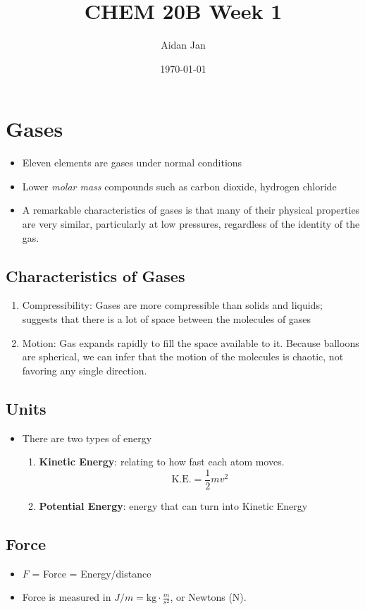 \documentclass[10pt]{article}
\title{CHEM 20B Week 1}
\author{Aidan Jan}
\date{\today}
\begin{document}
\maketitle
\section*{Gases}
\begin{itemize}
    \item Eleven elements are gases under normal conditions
    \item Lower \textit{molar mass} compounds such as carbon dioxide, hydrogen chloride
    \item A remarkable characteristics of gases is that many of their physical properties are very similar, particularly at low pressures, regardless of the identity of the gas.
\end{itemize}   

\subsection*{Characteristics of Gases}
\begin{enumerate}
    \item Compressibility: Gases are more compressible than solids and liquids; suggests that there is a lot of space between the molecules of gases
    \item Motion: Gas expands rapidly to fill the space available to it.  Because balloons are spherical, we can infer that the motion of the molecules is chaotic, not favoring any single direction.
\end{enumerate}

\subsection*{Units}
\begin{itemize}
    \item There are two types of energy
    \begin{enumerate}
        \item \textbf{Kinetic Energy}: relating to how fast each atom moves.
            \[\text{K.E.} = \frac{1}{2}mv^2\]
        \item \textbf{Potential Energy}: energy that can turn into Kinetic Energy
    \end{enumerate}
\end{itemize}

\subsection*{Force}
\begin{itemize}
    \item $F$ = Force = Energy/distance
    \item Force is measured in $J/m = \text{kg} \cdot \frac{m}{s^2}$, or Newtons (N).
\end{itemize}
\end{document}
